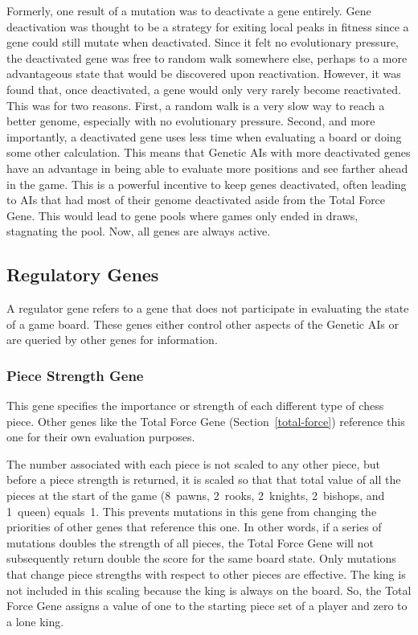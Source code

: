 \documentclass[letterpaper]{article}
\renewcommand{\_}{\allowbreak\textunderscore\allowbreak}
\begin{document}
Formerly, one result of a mutation was to deactivate a gene entirely. Gene deactivation was thought to be a strategy for exiting local peaks in fitness since a gene could still mutate when deactivated. Since it felt no evolutionary pressure, the deactivated gene was free to random walk somewhere else, perhaps to a more advantageous state that would be discovered upon reactivation. However, it was found that, once deactivated, a gene would only very rarely become reactivated. This was for two reasons. First, a random walk is a very slow way to reach a better genome, especially with no evolutionary pressure. Second, and more importantly, a deactivated gene uses less time when evaluating a board or doing some other calculation. This means that Genetic AIs with more deactivated genes have an advantage in being able to evaluate more positions and see farther ahead in the game. This is a powerful incentive to keep genes deactivated, often leading to AIs that had most of their genome deactivated aside from the Total Force Gene. This would lead to gene pools where games only ended in draws, stagnating the pool. Now, all genes are always active.

\subsection{Regulatory Genes}
A regulator gene refers to a gene that does not participate in evaluating the state of a game board. These genes either control other aspects of the Genetic AIs or are queried by other genes for information.

\subsubsection{Piece Strength Gene}
This gene specifies the importance or strength of each different type of chess piece. Other genes like the Total Force Gene (Section~\ref{total-force}) reference this one for their own evaluation purposes.

The number associated with each piece is not scaled to any other piece, but before a piece strength is returned, it is scaled so that that total value of all the pieces at the start of the game (8~pawns, 2~rooks, 2~knights, 2~bishops, and 1~queen) equals~1. This prevents mutations in this gene from changing the priorities of other genes that reference this one. In other words, if a series of mutations doubles the strength of all pieces, the Total Force Gene will not subsequently return double the score for the same board state. Only mutations that change piece strengths with respect to other pieces are effective. The king is not included in this scaling because the king is always on the board. So, the Total Force Gene assigns a value of one to the starting piece set of a player and zero to a lone king.
\end{document}
